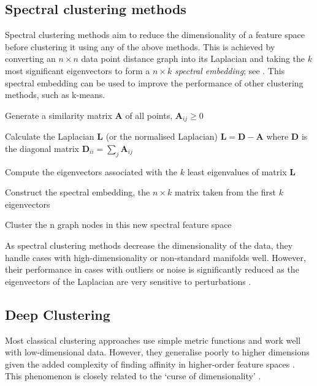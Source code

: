 \documentclass[../thesis.tex]{subfiles}
\begin{document}
\subsection{Spectral clustering methods} 
Spectral clustering methods \cite{VonLuxburg2007, Nie2011, Shi, Ng2002, shi2003multiclass} aim to reduce the dimensionality of a feature space before clustering it using any of the above methods.
This is achieved by converting an $n\times n$ data point distance graph into its Laplacian and taking the $k$ most significant eigenvectors to form a $n\times k$ \textit{spectral embedding}; see . This spectral embedding can be used to improve the performance of other clustering methods, such as k-means. 

\begin{algorithm}
\caption{An abstract description of Spectral Clustering}\label{alg__DMS__spectralclustering}
\begin{algorithmic}
\State Generate a similarity matrix $\mathbf{A}$ of all points, $\mathbf{A}_{ij}\geq 0$

    \State Calculate the Laplacian $\mathbf{L}$ (or the normalised Laplacian)
    $\mathbf{L}=\mathbf{D}-\mathbf{A}$ where $\mathbf{D}$ is the diagonal matrix $\mathbf{D}_{ii}=\sum _{j}\mathbf{A}_{ij}$
    
    \State Compute the eigenvectors associated with the $k$ least eigenvalues of matrix $\mathbf{L}$
    
    \State Construct the spectral embedding, the $n \times k$ matrix taken from the first $k$ eigenvectors


    \State Cluster the n graph nodes in this new spectral feature space

\end{algorithmic}
\end{algorithm}

As spectral clustering methods decrease the dimensionality of the data, they handle cases with high-dimensionality or non-standard manifolds well. However, their performance in cases with outliers or noise is significantly reduced as the eigenvectors of the Laplacian are very sensitive to perturbations \cite{grady2006isoperimetric}.

\subsection{Deep Clustering}\label{sec__DMS__rel_deep}
Most classical clustering approaches use simple metric functions and work well with low-dimensional data. However, they generalise poorly to higher dimensions given the added complexity of finding affinity in higher-order feature spaces \cite{Aggarwal2001}. This phenomenon is closely related to the `curse of dimensionality' \cite{Domingos:2012:FUT:2347736.2347755, Bellman1962}. 
\end{document}
